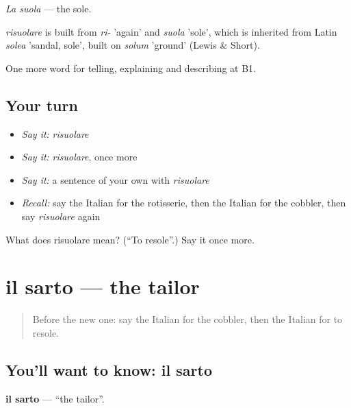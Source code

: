 \emph{La suola} — the sole.

\begin{cousinweb}
\emph{risuolare} is built from \emph{ri-} 'again' and \emph{suola} 'sole', which is inherited from Latin \emph{solea} 'sandal, sole', built on \emph{solum} 'ground' (Lewis \& Short).
\end{cousinweb}

\begin{grammarlens}[title={What you've built}]
One more word for telling, explaining and describing at B1.
\end{grammarlens}

\subsection*{Your turn}
\begin{itemize}
\raggedright
  \item \emph{Say it:} \emph{risuolare}
  \item \emph{Say it:} \emph{risuolare}, once more
  \item \emph{Say it:} a sentence of your own with \emph{risuolare}
  \item \emph{Recall:} say the Italian for the rotisserie, then the Italian for the cobbler, then say \emph{risuolare} again
\end{itemize}

\begin{tcolorbox}[breakable,colback=teal!4,colframe=teal!35!black,title={Before you move on}]
What does risuolare mean? (\textquotedblleft{}To resole\textquotedblright{}.) Say it once more.
\end{tcolorbox}
\section[il sarto]{il sarto — the tailor}

\label{lesson:IT-C455-sarto}



\begin{quote}
Before the new one: say the Italian for the cobbler, then the Italian for to resole.
\end{quote}

\subsection*{You'll want to know: il sarto}
\textbf{il sarto} — \textquotedblleft{}the tailor\textquotedblright{}.

